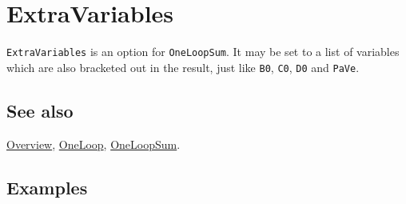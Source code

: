 \documentclass[../FeynCalcManual.tex]{subfiles}
\begin{document}
\hypertarget{extravariables}{%
\section{ExtraVariables}\label{extravariables}}

\texttt{ExtraVariables} is an option for \texttt{OneLoopSum}. It may be
set to a list of variables which are also bracketed out in the result,
just like \texttt{B0}, \texttt{C0}, \texttt{D0} and \texttt{PaVe}.

\subsection{See also}

\hyperlink{toc}{Overview}, \hyperlink{oneloop}{OneLoop},
\hyperlink{oneloopsum}{OneLoopSum}.

\subsection{Examples}
\end{document}
